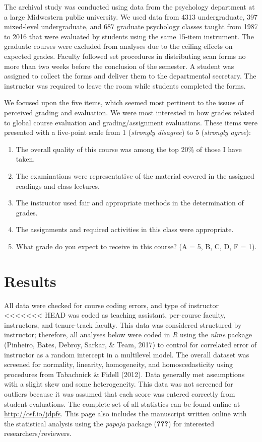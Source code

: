 \documentclass[,man]{apa6}
\providecommand{\tightlist}{%
  \setlength{\itemsep}{0pt}\setlength{\parskip}{0pt}}
\theoremstyle{definition}
\theoremstyle{definition}
\theoremstyle{definition}
\theoremstyle{remark}
\begin{document}
The archival study was conducted using data from the psychology
department at a large Midwestern public university. We used data from
4313 undergraduate, 397 mixed-level undergraduate, and 687 graduate
psychology classes taught from 1987 to 2016 that were evaluated by
students using the same 15-item instrument. The graduate courses were
excluded from analyses due to the ceiling effects on expected grades.
Faculty followed set procedures in distributing scan forms no more than
two weeks before the conclusion of the semester. A student was assigned
to collect the forms and deliver them to the departmental secretary. The
instructor was required to leave the room while students completed the
forms.

We focused upon the five items, which seemed most pertinent to the
issues of perceived grading and evaluation. We were most interested in
how grades related to global course evaluation and grading/assignment
evaluations. These items were presented with a five-point scale from 1
(\emph{strongly disagree}) to 5 (\emph{strongly agree}):

\begin{enumerate}
\def\labelenumi{\arabic{enumi})}
\tightlist
\item
  The overall quality of this course was among the top 20\% of those I
  have taken.
\item
  The examinations were representative of the material covered in the
  assigned readings and class lectures.
\item
  The instructor used fair and appropriate methods in the determination
  of grades.
\item
  The assignments and required activities in this class were
  appropriate.
\item
  What grade do you expect to receive in this course? (A = 5, B, C, D, F
  = 1).
\end{enumerate}

\section{Results}\label{results}

All data were checked for course coding errors, and type of instructor
<<<<<<< HEAD
was coded as teaching assistant, per-course faculty, instructors, and
tenure-track faculty. This data was considered structured by instructor;
therefore, all analyses below were coded in \emph{R} using the
\emph{nlme} package (Pinheiro, Bates, Debroy, Sarkar, \& Team, 2017) to
control for correlated error of instructor as a random intercept in a
multilevel model. The overall dataset was screened for normality,
linearity, homogeneity, and homoscedasticity using procedures from
Tabachnick \& Fidell (2012). Data generally met assumptions with a
slight skew and some heterogeneity. This data was not screened for
outliers because it was assumed that each score was entered correctly
from student evaluations. The complete set of all statistics can be
found online at \url{http://osf.io/jdpfs}. This page also includes the
manuscript written online with the statistical analysis using the
\emph{papaja} package ({\textbf{???}}) for interested
researchers/reviewers.
\end{document}
